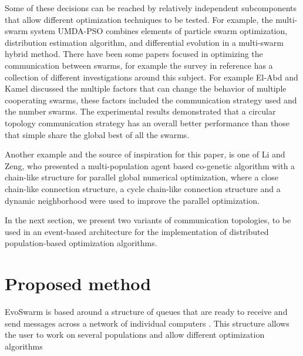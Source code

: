 \documentclass[runningheads]{llncs}
\begin{document}
Some of these decisions can be reached by relatively independent
subcomponents that allow different optimization techniques to be
tested. For example, the multi-swarm system UMDA-PSO \cite{b10}
combines elements of particle swarm optimization, distribution
estimation algorithm, and differential evolution in a multi-swarm
hybrid method. %
There have been some papers focused in optimizing the communication
between swarms, for example the survey in reference \cite{b15} has a
collection of different investigations around this subject. For
example El-Abd and Kamel discussed the multiple factors that can
change the behavior of multiple cooperating swarms, these factors
included the communication strategy used and the number swarms. The
experimental results demonstrated that a circular topology
communication strategy has an overall better performance than those
that simple share the global best of all the swarms\cite{b16}. 

Another example and the source of inspiration for this paper, is one
of Li and Zeng, who presented a multi-population agent based
co-genetic algorithm with a chain-like structure for parallel global
numerical optimization, where a close chain-like connection structure,
a cycle chain-like connection structure and a dynamic neighborhood
were used to improve the parallel optimization\cite{b17}. 

In the next section, we present two variants of communication topologies,
to be used in an event-based architecture for the implementation of 
distributed population-based optimization algorithms.


\section{Proposed method}

EvoSwarm is based around a structure of queues that are ready to
receive and send messages across a network of individual computers
\cite{b18}. %
This structure  allows the user to work on several populations and
allow different optimization algorithms %

\end{document}
